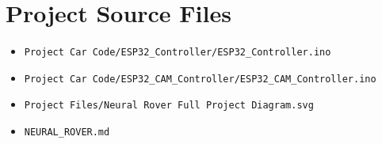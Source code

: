 \documentclass[12pt,a4paper,oneside]{report}
\newcommand{\code}[1]{\texttt{#1}}
\begin{document}
\chapter{Project Source Files}
\begin{itemize}
  \item \code{Project Car Code/ESP32\_Controller/ESP32\_Controller.ino}
  \item \code{Project Car Code/ESP32\_CAM\_Controller/ESP32\_CAM\_Controller.ino}
  \item \code{Project Files/Neural Rover Full Project Diagram.svg}
  \item \code{NEURAL\_ROVER.md}
\end{itemize}



\end{document}
